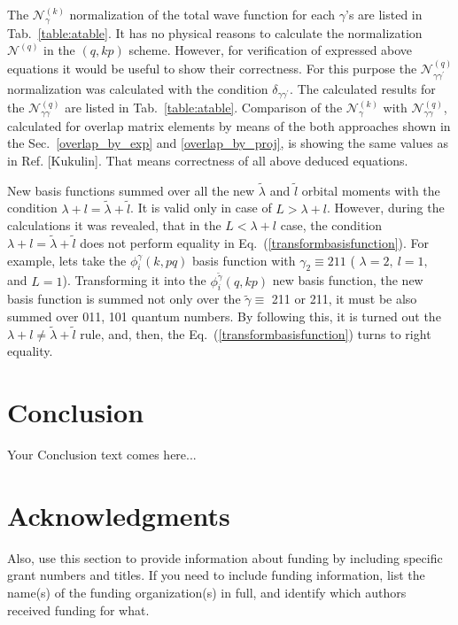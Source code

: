 \documentclass[12pt,a4paper,twoside]{article}
\begin{document}
The $\mathcal{N}_{\gamma}^{(k)}$ normalization of the total wave function for each $\gamma$'s are listed in Tab.~\ref{table:atable}.
It has no physical reasons to calculate the normalization $\mathcal{N}^{(q)}$ in the $(q,kp)$ scheme. However, for verification of expressed above equations it would be useful to show their correctness. For this purpose the $\mathcal{N}_{\gamma \gamma^{\prime}}^{(q)}$ normalization was calculated with the condition $\delta_{\gamma \gamma^{\prime}}$. The calculated results for the $\mathcal{N}_{\gamma \gamma}^{(q)}$ are listed in Tab.~\ref{table:atable}. Comparison of the $\mathcal{N}_{\gamma}^{(k)}$ with $\mathcal{N}_{\gamma \gamma}^{(q)}$, calculated for overlap matrix elements by means of the both approaches  shown in the Sec.~\ref{overlap_by_exp}  and \ref{overlap_by_proj}, is showing   the same values as in Ref. [Kukulin]. That means correctness of all above deduced equations.

New basis functions summed over all the new $\tilde{\lambda}$ and $\tilde{l}$ orbital moments with the condition $\lambda + l = \tilde{\lambda} +\tilde{l} $. It is valid only in case of $L > \lambda + l$. However, during the calculations it was revealed, that in the $L < \lambda + l$  case, the condition $\lambda + l = \tilde{\lambda} +\tilde{l} $ does not perform equality in Eq.~(\ref{transformbasisfunction}). For example, lets take the  $\phi_{i}^{\gamma}\left(k, pq \right)$ basis function with $\gamma_2 \equiv 211$ ( $\lambda=2,~l=1,$ and $L=1$). Transforming it into the $\phi_{i}^{\tilde{\gamma}}\left(q, kp \right)$ new basis function, the new basis function is summed not only over the $\tilde{\gamma}\equiv$ 211 or 211, it must be also summed over 011, 101 quantum numbers. By following this, it is turned out the $\lambda + l \neq \tilde{\lambda} +\tilde{l} $ rule, and, then, the  Eq.~(\ref{transformbasisfunction}) turns to right equality.




\section*{Conclusion}

Your Conclusion text comes here...

\section*{Acknowledgments }


Also, use this section to provide information about funding by including specific grant numbers and titles. If you need to include funding information, list the name(s) of the funding organization(s) in full, and identify which authors received funding for what.
\end{document}
